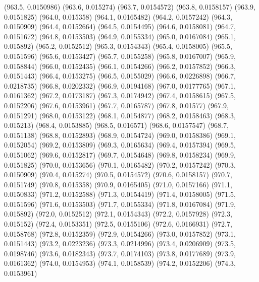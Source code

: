 {					(963.5, 0.0150986)
					(963.6, 0.015274)
					(963.7, 0.0154572)
					(963.8, 0.0158157)
					(963.9, 0.0151825)
					(964.0, 0.015358)
					(964.1, 0.0165482)
					(964.2, 0.0157242)
					(964.3, 0.0150909)
					(964.4, 0.0152664)
					(964.5, 0.0154495)
					(964.6, 0.0158081)
					(964.7, 0.0151672)
					(964.8, 0.0153503)
					(964.9, 0.0155334)
					(965.0, 0.0167084)
					(965.1, 0.015892)
					(965.2, 0.0152512)
					(965.3, 0.0154343)
					(965.4, 0.0158005)
					(965.5, 0.0151596)
					(965.6, 0.0153427)
					(965.7, 0.0155258)
					(965.8, 0.0167007)
					(965.9, 0.0158844)
					(966.0, 0.0152435)
					(966.1, 0.0154266)
					(966.2, 0.0157852)
					(966.3, 0.0151443)
					(966.4, 0.0153275)
					(966.5, 0.0155029)
					(966.6, 0.0226898)
					(966.7, 0.0218735)
					(966.8, 0.0202332)
					(966.9, 0.0194168)
					(967.0, 0.0177765)
					(967.1, 0.0161362)
					(967.2, 0.0173187)
					(967.3, 0.0174942)
					(967.4, 0.0158615)
					(967.5, 0.0152206)
					(967.6, 0.0153961)
					(967.7, 0.0165787)
					(967.8, 0.01577)
					(967.9, 0.0151291)
					(968.0, 0.0153122)
					(968.1, 0.0154877)
					(968.2, 0.0158463)
					(968.3, 0.015213)
					(968.4, 0.0153885)
					(968.5, 0.016571)
					(968.6, 0.0157547)
					(968.7, 0.0151138)
					(968.8, 0.0152893)
					(968.9, 0.0154724)
					(969.0, 0.0158386)
					(969.1, 0.0152054)
					(969.2, 0.0153809)
					(969.3, 0.0165634)
					(969.4, 0.0157394)
					(969.5, 0.0151062)
					(969.6, 0.0152817)
					(969.7, 0.0154648)
					(969.8, 0.0158234)
					(969.9, 0.0151825)
					(970.0, 0.0153656)
					(970.1, 0.0165482)
					(970.2, 0.0157242)
					(970.3, 0.0150909)
					(970.4, 0.015274)
					(970.5, 0.0154572)
					(970.6, 0.0158157)
					(970.7, 0.0151749)
					(970.8, 0.015358)
					(970.9, 0.0165405)
					(971.0, 0.0157166)
					(971.1, 0.0150833)
					(971.2, 0.0152588)
					(971.3, 0.0154419)
					(971.4, 0.0158005)
					(971.5, 0.0151596)
					(971.6, 0.0153503)
					(971.7, 0.0155334)
					(971.8, 0.0167084)
					(971.9, 0.015892)
					(972.0, 0.0152512)
					(972.1, 0.0154343)
					(972.2, 0.0157928)
					(972.3, 0.015152)
					(972.4, 0.0153351)
					(972.5, 0.0155106)
					(972.6, 0.0166931)
					(972.7, 0.0158768)
					(972.8, 0.0152359)
					(972.9, 0.0154266)
					(973.0, 0.0157852)
					(973.1, 0.0151443)
					(973.2, 0.0223236)
					(973.3, 0.0214996)
					(973.4, 0.0206909)
					(973.5, 0.0198746)
					(973.6, 0.0182343)
					(973.7, 0.0174103)
					(973.8, 0.0177689)
					(973.9, 0.0161362)
					(974.0, 0.0154953)
					(974.1, 0.0158539)
					(974.2, 0.0152206)
					(974.3, 0.0153961)
}

